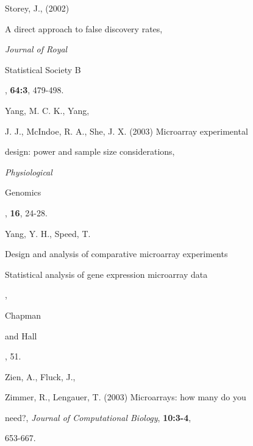 \documentclass[12pt]{article}
\begin{document}
\begin{thebibliography}{}
 Storey, J., (2002)

  A direct approach to false discovery rates, {\it Journal of Royal

  Statistical Society B}, {\bf 64:3}, 479-498.



 Yang, M. C. K., Yang,

  J. J., McIndoe, R. A., She, J. X. (2003) Microarray experimental

  design: power and sample size considerations, {\it Physiological

  Genomics}, {\bf 16}, 24-28.



 Yang, Y. H., Speed, T.

  {Design and analysis of comparative microarray experiments \it

  Statistical analysis of gene expression microarray data}, {Chapman

  and Hall}, 51.



 Zien, A., Fluck, J.,

  Zimmer, R., Lengauer, T. (2003) Microarrays: how many do you

  need?, {\it Journal of Computational Biology}, {\bf 10:3-4},

  653-667.



\end{thebibliography}
\end{document}
